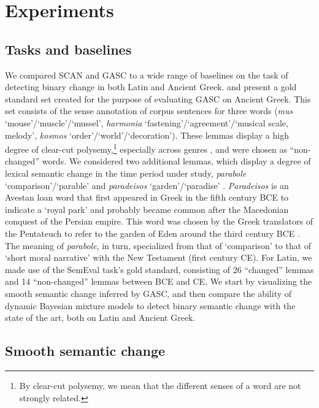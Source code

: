 \documentclass[output=paper%
]{langscibook}
\begin{document}
\section{Experiments}
\label{sec:results}


\subsection{Tasks and baselines}
We compared SCAN and GASC to a wide range of baselines on the task of detecting binary change in both Latin and Ancient Greek. \citet{perrone-etal-2019-gasc} and \citet{annodata} present a gold standard set created for the purpose of evaluating GASC on Ancient Greek. This set consists of the sense annotation of corpus sentences for three words (\emph{mus} `mouse'\slash`muscle'\slash`mussel', \emph{harmonia} `fastening'\slash`agreement'\slash`musical scale, melody', \emph{kosmos} `order'\slash`world'\slash`decoration'). These lemmas display a high degree of clear-cut polysemy,\footnote{By clear-cut polysemy, we mean that the different senses of a word are not strongly related.} especially across genres \citep{liddell:1996, pollitt_ancient_1974}, and were chosen as ``non-changed'' words. We considered two additional lemmas, which display a degree of lexical semantic change in the time period under study, \emph{parabole} `comparison'/`parable' and \emph{paradeisos} `garden'/`paradise' \citep{mcgillivray2019computational}. \emph{Paradeisos} is an Avestan loan word that first appeared in Greek in the fifth century BCE to indicate a `royal park' and probably became common after the Macedonian conquest of the Persian empire. This word was chosen by the Greek translators of the Pentateuch to refer to the garden of Eden around the third century BCE \citep{christidis_2007}. The meaning of  \emph{parabole}, in turn, specialized from that of `comparison' to that of `short moral narrative' with the New Testament (first century CE). For Latin, we made use of the SemEval task's gold standard, consisting of 26 ``changed'' lemmas and 14 ``non-changed'' lemmas between BCE and CE. We start by visualizing the smooth semantic change inferred by GASC, and then compare the ability of dynamic Bayesian mixture models to detect binary semantic change with the state of the art, both on Latin and Ancient Greek.



\subsection{Smooth semantic change}
\end{document}

